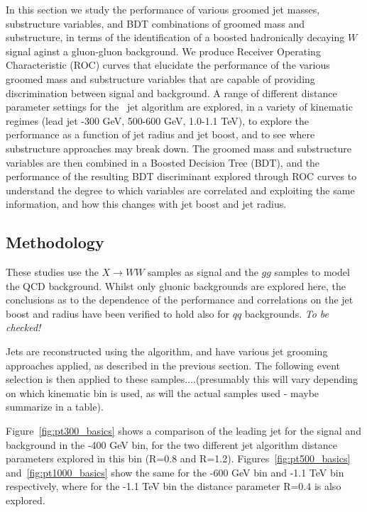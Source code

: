 In this section we study the performance of various groomed jet
masses, substructure variables, and BDT combinations of groomed mass
and substructure, in terms of the
identification of a boosted hadronically decaying $W$ signal aginst a gluon-gluon
background. We produce Receiver Operating Characteristic (ROC)
curves that elucidate the performance of the various groomed mass and
substructure variables that are
capable of providing discrimination between signal and background. A
range of different distance parameter settings for the \antikt~jet
algorithm are explored, in a variety of kinematic regimes
(lead jet -300 GeV, 500-600 GeV, 1.0-1.1 TeV), to explore the
performance as a function of jet radius and jet boost, and to see
where substructure approaches may break down. The groomed
mass and substructure variables are then combined in a Boosted Decision Tree (BDT), and the performance of the resulting BDT discriminant
explored through ROC curves to understand the degree to which
variables are correlated and exploiting the same information, and how
this changes with jet boost and jet radius. 

\subsection{Methodology}

These studies use the $X \rightarrow WW$ samples as signal and the $gg$
samples to model the QCD background. Whilst only gluonic backgrounds
are explored here, the conclusions as to the dependence of the
performance and correlations on the jet boost and radius have been
verified to hold also for $qq$ backgrounds. {\it To be checked!}

Jets are reconstructed using the \antikt algorithm, and have various
jet grooming approaches applied, as described in the
previous section. The following event selection is then applied to these
samples....(presumably this will vary depending on which kinematic bin
is used, as will the actual samples used - maybe summarize in a table).

Figure~\ref{fig:pt300_basics} shows a comparison of the
leading jet \pt for the signal and background in the -400 GeV bin, for the two different \antikt jet
algorithm distance parameters explored in this bin (R=0.8 and R=1.2). Figures~\ref{fig:pt500_basics} and~\ref{fig:pt1000_basics}  show the same for the
-600 GeV bin and -1.1 TeV bin respectively, where for
the -1.1 TeV bin the distance parameter R=0.4 is also explored.

